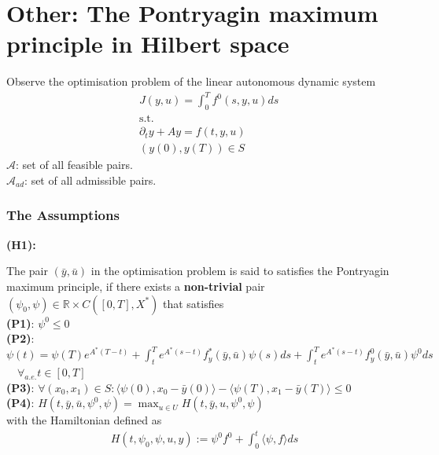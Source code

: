 \section{Other: The Pontryagin maximum principle in Hilbert space}
Observe the optimisation problem of the linear autonomous dynamic system
\begin{align*}
	& J(y, u) = \int_0^T f^0(s, y, u) ds \\
	& \text{s.t.}\\
	& \partial_t y + A y = f(t, y, u)\\
	& (y(0), y(T)) \in S
\end{align*}
$\mathcal{A}$: set of all feasible pairs. \\
$\mathcal{A}_{ad}$: set of all admissible pairs.

\subsubsection*{The Assumptions}
\textbf{(H1):}


\begin{definition}
	The pair $(\bar{y}, \bar{u})$ in the optimisation problem is said to satisfies the Pontryagin maximum principle, if there exists a \textbf{non-trivial} pair $(\psi_0, \psi) \in \mathbb{R} \times C([0, T], X^*)$ that satisfies\\
	\textbf{(P1)}: $\psi^0 \le 0$\\
	\textbf{(P2)}: $\psi(t) = \psi(T) e^{A^*(T - t)} + \int_t^T e^{A^*(s - t)} f_y^*(\bar{y}, \bar{u}) \psi(s) ds + \int_t^T e^{A^*(s - t)} f^0_y(\bar{y}, \bar{u}) \psi^0 ds  $ $\quad\forall_{a.e.} t \in [0, T]$\\
	\textbf{(P3)}: $\forall (x_0, x_1) \in S: \langle \psi(0), x_0 - \bar{y}(0) \rangle - \langle \psi(T), x_1 - \bar{y}(T) \rangle \le 0$\\
	\textbf{(P4)}: $H(t, \bar{y}, \bar{u}, \psi^0, \psi) = \max_{u \in U} H(t, \bar{y}, u, \psi^0, \psi)$
	\\
	with the Hamiltonian defined as
	\begin{align*}
		H(t, \psi_0, \psi, u, y):= \psi^0 f^0 + \int_0^t \langle \psi, f \rangle ds
	\end{align*}
\end{definition}

\begin{theorem}
	
\end{theorem}


